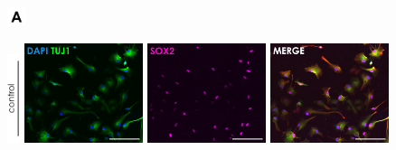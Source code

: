 \documentclass[onecolumn,10pt]{asme2ej}
\begin{document}
\begin{figure}[h]
	\includegraphics[width=0.05\textwidth]{figures/a}
	
	
	\includegraphics[width=0.033\textwidth]{figures/IF/diff+rad/labCTRL}
	\includegraphics[width=0.31\textwidth]{figures/IF/diff+rad(light)/no-t}
	\includegraphics[width=0.31\textwidth]{figures/IF/diff+rad(light)/no-s}
	\includegraphics[width=0.31\textwidth]{figures/IF/diff+rad(light)/no-m}


\end{figure}
\end{document}
